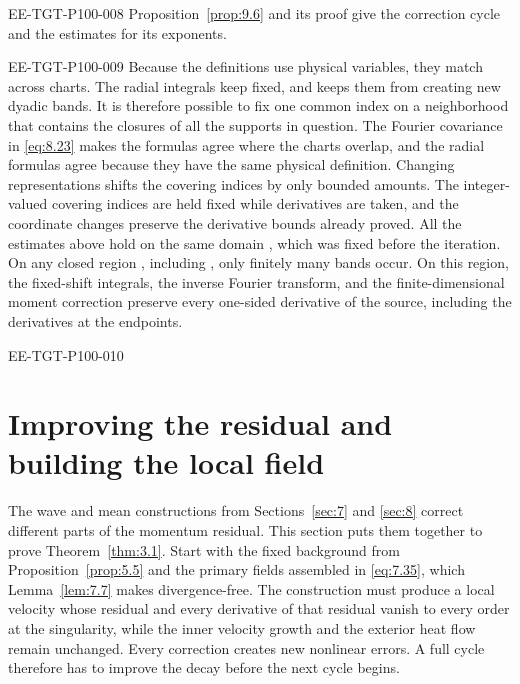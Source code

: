 \begin{EESegment}{EE-TGT-P100-008}
Proposition~\ref{prop:9.6} and its proof give the correction cycle and the estimates for its
exponents.
\end{EESegment}

\begin{EESegment}{EE-TGT-P100-009}
Because the definitions use physical variables, they match across charts. The radial integrals keep
 fixed, and  keeps them from creating
new dyadic bands. It is therefore possible to fix one common index on a neighborhood that contains
the closures of all the supports in question. The Fourier covariance in \eqref{eq:8.23} makes the
formulas agree where the charts overlap, and the radial formulas agree because they have the same
physical definition. Changing representations shifts the covering indices by only bounded amounts.
The integer-valued covering indices are held fixed while derivatives are taken, and the coordinate
changes preserve the derivative bounds already proved. All the estimates above hold on the same
domain , which was fixed before the iteration. On any closed region
, including , only finitely many
bands occur. On this region, the fixed-shift integrals, the inverse Fourier transform, and the
finite-dimensional moment correction preserve every one-sided derivative of the source, including
the derivatives at the endpoints.
\end{EESegment}

\begin{EESegment}{EE-TGT-P100-010}
\section{Improving the residual and building the local field}\label{sec:9}
The wave and mean constructions from Sections~\ref{sec:7} and \ref{sec:8} correct different parts
of the momentum residual. This section puts them together to prove Theorem~\ref{thm:3.1}. Start
with the fixed background  from Proposition~\ref{prop:5.5} and the
primary fields assembled in \eqref{eq:7.35}, which Lemma~\ref{lem:7.7} makes divergence-free. The
construction must produce a local velocity  whose residual and every
derivative of that residual vanish to every order at the singularity, while the inner velocity growth
and the exterior heat flow remain unchanged. Every correction creates new nonlinear errors. A full
cycle therefore has to improve the decay before the next cycle begins.
\end{EESegment}

